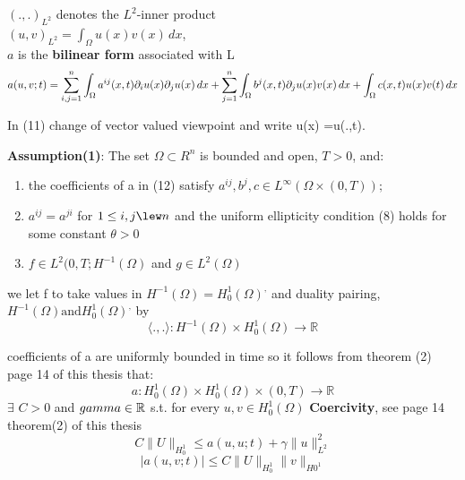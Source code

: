 $(.,.)_{L^{2}}$ denotes the $L^{2}$-inner product\\

$(u,v)_{L^{2}} = \int_{\Omega} u(x)v(x)\,dx $,\\

$a$ is the \textbf{bilinear form} associated with L\\

\begin{equation}
    a(u,v;t)= \sum_{i,j=1}^{n} \int_{\Omega} a^{ij}(x,t) \partial_{i} u(x) \partial_{j} u(x) \,dx \\ +\sum_{j=1}^{n} \int_{\Omega} b^{j}(x,t) \partial_{j} u(x) v(x) \,dx +
    \int_{\Omega} c(x,t) u(x) v(t) \,dx
\end{equation}

In (11) change of vector valued viewpoint and write u(x) =u(.,t).

\textbf{Assumption(1)}: The set $\Omega \subset R^{n}$ is bounded and open, $T>0$, and:
\begin{enumerate}
    \item the coefficients of a in (12) satisfy $ a^{ij}, b^{j}, c \in L^{\infty}(\Omega \times (0,T));$ \\
    \item $a^{ij}=a^{ji} $ for $1 \leq i,j \lew n$ and the uniform ellipticity condition (8) holds for some constant $\theta > 0$
    \item $f \in L^{2}(0,T;H^{-1}(\Omega)$ and $g \in L^{2}(\Omega)$
\end{enumerate}

we let f to take values in $H^{-1}(\Omega)=H_{0}^{1}(\Omega)^{,}$ and duality pairing,\\$H^{-1}(\Omega) \text{and} H_{0}^{1}(\Omega)^{,}$ by\\

\[ \langle .,. \rangle : H^{-1}(\Omega) \times H_{0}^{1}(\Omega) \rightarrow \mathbb{R}               \]

coefficients of a are uniformly bounded in time so it follows from theorem (2) page 14 of this thesis that:
\[a:H_{0}^{1}(\Omega) \times H_{0}^{1}(\Omega) \times (0,T) \rightarrow \mathbb{R}
\]
$\exists$   $C>0$ and $\\gamma \in \mathbb{R}$ s.t. for every $u,v \in H_{0}^{1}(\Omega)$ \textbf{Coercivity}, see page 14 theorem(2) of this thesis
\begin{equation}
    C\|U\|_{H_{0}^{1}} \leq a(u,u;t) + \gamma \|u\|_{L^{2}}^{2}
\end{equation}
\begin{equation}
    |a(u,v;t)| \leq C \|U\|_{H_{0}^{1}} \|v\|_{H{0}^{1}}
\end{equation}
     

